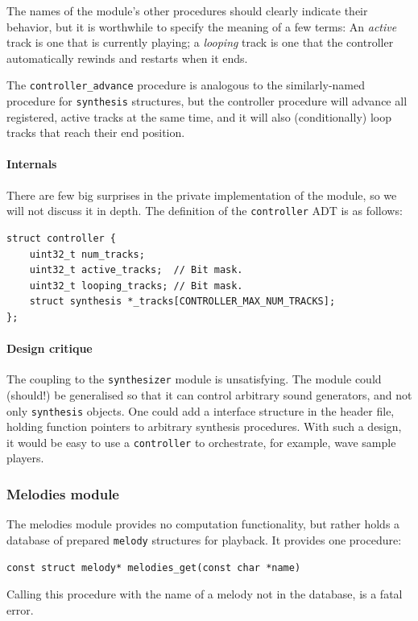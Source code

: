 \documentclass[a4paper,9pt]{article}
\newcommand{\isrc}[1]{\texttt{#1}}
\begin{document}
The names of the module's other procedures should clearly indicate their
behavior, but it is worthwhile to specify the meaning of a few terms: An
\emph{active} track is one that is currently playing; a
\emph{looping} track is one that the controller automatically rewinds and
restarts when it ends.

The \isrc{controller\_advance} procedure is analogous to the similarly-named
procedure for \isrc{synthesis} structures, but the controller procedure will
advance all registered, active tracks at the same time, and it will also
(conditionally) loop tracks that reach their end position.

\paragraph{Internals}
There are few big surprises in the private implementation of the module, so we
will not discuss it in depth. The definition of the \isrc{controller} ADT is
as follows:
\begin{lstlisting}
struct controller {
    uint32_t num_tracks;
    uint32_t active_tracks;  // Bit mask.
    uint32_t looping_tracks; // Bit mask.
    struct synthesis *_tracks[CONTROLLER_MAX_NUM_TRACKS];
};
\end{lstlisting}

\paragraph{Design critique}
The coupling to the \isrc{synthesizer} module is unsatisfying. The module
could (should!) be generalised so that it can control arbitrary sound
generators, and not only \isrc{synthesis} objects. One could add a interface
structure in the header file, holding function pointers to 
arbitrary synthesis procedures. With such a design, it would be easy to use a
\isrc{controller} to orchestrate, for example, wave sample players.

\clearpage


\subsubsection{Melodies module}
The melodies module provides no computation functionality, but rather holds
a database of prepared \isrc{melody} structures for playback. It provides one
procedure: 
\begin{lstlisting}
const struct melody* melodies_get(const char *name)
\end{lstlisting}
Calling this procedure with the name of a melody not in the database, is a
fatal error.
\end{document}
